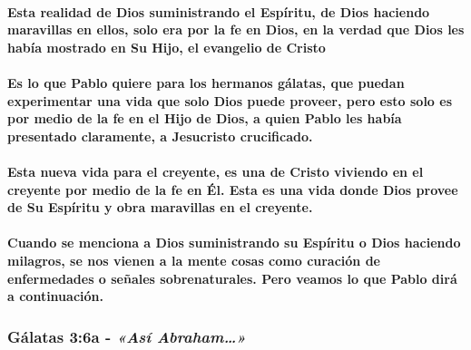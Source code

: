 \documentclass[11a pt,twoside]{article}
\newcommand{\scripture}[1]{%
  {\fontsize{12pt}{16pt}\selectfont\ScriptureFont\itshape #1}%
}
\let\oldsubsubsection\subsubsection
\renewcommand{\subsubsection}{\needspace{4\baselineskip}\oldsubsubsection}
\let\oldparagraph\paragraph
\renewcommand{\paragraph}{\needspace{3\baselineskip}\oldparagraph}
\begin{document}
\paragraph{Esta realidad de Dios suministrando el Espíritu, de Dios
haciendo maravillas en ellos, solo era por la fe en Dios, en la verdad
que Dios les había mostrado en Su Hijo, el evangelio de
Cristo}\label{esta-realidad-de-dios-suministrando-el-espuxedritu-de-dios-haciendo-maravillas-en-ellos-solo-era-por-la-fe-en-dios-en-la-verdad-que-dios-les-habuxeda-mostrado-en-su-hijo-el-evangelio-de-cristo}

\paragraph{Es lo que Pablo quiere para los hermanos gálatas, que puedan
experimentar una vida que solo Dios puede proveer, pero esto solo es por
medio de la fe en el Hijo de Dios, a quien Pablo les había presentado
claramente, a Jesucristo
crucificado.}\label{es-lo-que-pablo-quiere-para-los-hermanos-guxe1latas-que-puedan-experimentar-una-vida-que-solo-dios-puede-proveer-pero-esto-solo-es-por-medio-de-la-fe-en-el-hijo-de-dios-a-quien-pablo-les-habuxeda-presentado-claramente-a-jesucristo-crucificado.}

\paragraph{Esta nueva vida para el creyente, es una de Cristo viviendo
en el creyente por medio de la fe en Él. Esta es una vida donde Dios
provee de Su Espíritu y obra maravillas en el
creyente.}\label{esta-nueva-vida-para-el-creyente-es-una-de-cristo-viviendo-en-el-creyente-por-medio-de-la-fe-en-uxe9l.-esta-es-una-vida-donde-dios-provee-de-su-espuxedritu-y-obra-maravillas-en-el-creyente.}

\paragraph{Cuando se menciona a Dios suministrando su Espíritu o Dios
haciendo milagros, se nos vienen a la mente cosas como curación de
enfermedades o señales sobrenaturales. Pero veamos lo que Pablo dirá a
continuación.}\label{cuando-se-menciona-a-dios-suministrando-su-espuxedritu-o-dios-haciendo-milagros-se-nos-vienen-a-la-mente-cosas-como-curaciuxf3n-de-enfermedades-o-seuxf1ales-sobrenaturales.-pero-veamos-lo-que-pablo-diruxe1-a-continuaciuxf3n.}

\subsubsection{\texorpdfstring{Gálatas 3:6a -
\scripture{«Así Abraham…»}}{Gálatas 3:6a - }}\label{guxe1latas-36a---asuxed-abraham}
\end{document}
